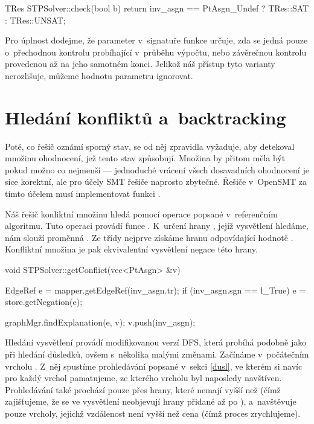 \begin{code}
TRes STPSolver::check(bool b) { 
	return inv_asgn == PtAsgn_Undef ? TRes::SAT : TRes::UNSAT; 
}
\end{code}
Pro úplnost dodejme, že parameter  v~signatuře funkce  určuje, zda se jedná pouze o~přechodnou kontrolu probíhající v~průběhu výpočtu, nebo závěrečnou kontrolu provedenou až na jeho samotném konci. Jelikož náš přístup tyto varianty nerozlišuje, můžeme hodnotu parametru ignorovat.

\section{Hledání konfliktů a~backtracking}

Poté, co řešič oznámí sporný stav, se od něj zpravidla vyžaduje, aby detekoval množinu ohodnocení, jež tento stav způsobují. Množina by přitom měla být pokud možno co nejmenší --- jednoduché vrácení všech dosavadních ohodnocení je sice korektní, ale pro účely SMT řešiče naprosto zbytečné. Řešiče v~OpenSMT za tímto účelem musí implementovat funkci .

Náš řešič konliktní množinu hledá pomocí operace  popsané v~referenčním algoritmu. Tuto operaci provádí funce . K~určení hrany , jejíž vysvětlení hledáme, nám slouží proměnná . Ze třídy  nejprve získáme hranu odpovídající hodnotě . Konfliktní množina je pak ekvivalentní vysvětlení negace této hrany. 

\begin{code}
void STPSolver::getConflict(vec<PtAsgn> &v) {
	EdgeRef e = mapper.getEdgeRef(inv_asgn.tr);
	if (inv_asgn.sgn == l_True)
	    e = store.getNegation(e);
	
	graphMgr.findExplanation(e, v);
	v.push(inv_asgn);
}
\end{code}

Hledání vysvětlení provádí  modifikovanou verzí DFS, která probíhá podobně jako při hledání důsledků, ovšem s~několika malými změnami. Začínáme v~počátečním vrcholu . Z~něj spustíme prohledávání popsané v~sekci \ref{dusl}, ve kterém si navíc pro každý vrchol pamatujeme, ze kterého vrcholu byl naposledy navštíven. Prohledávání také prochází pouze přes hrany, které nemají  vyšší než  (čímž zajišťujeme, že se ve vysvětlení neobjevují hrany přidané až po ), a~navštěvuje pouze vrcholy, jejichž vzdálenost není vyšší než cena  (čímž proces zrychlujeme).

